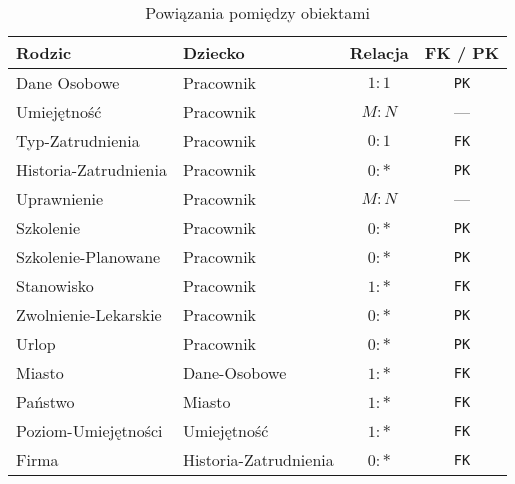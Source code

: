 \documentclass[a4paper]{article}
\begin{document}
\begin{table}[!htbp]
  \centering
  \begin{tabu}{|l|l|c|c|}
  \hline
	\large\textbf{Rodzic}&\large\textbf{Dziecko} &\large\textbf{Relacja}&\large\textbf{FK / PK}\\
	
	\hline
	Dane Osobowe & Pracownik  & $1:1$ & \texttt{PK} \\	
	\hline		
	Umiejętność & Pracownik  & $M:N$ &  --- \\
	\hline	
	Typ-Zatrudnienia & Pracownik & $0:1$ & \texttt{FK}\\
	\hline
	Historia-Zatrudnienia & Pracownik & $0:*$  & \texttt{PK}\\
	\hline
	Uprawnienie & Pracownik & $M:N$ & ---\\
	\hline
	Szkolenie & Pracownik & $0:*$ & \texttt{PK}\\
	\hline
	Szkolenie-Planowane & Pracownik & $0:*$ & \texttt{PK}\\
	\hline
	Stanowisko & Pracownik& $1:*$ &	\texttt{FK}\\
	\hline
	Zwolnienie-Lekarskie & Pracownik & $0:*$ & \texttt{PK}\\
	\hline
	Urlop & Pracownik & $0:*$ & \texttt{PK}\\	
	
	\hline	
	Miasto &  Dane-Osobowe &$1:*$ &\texttt{FK}\\
	
	\hline
	Państwo & Miasto & $1:*$ & \texttt{FK}	\\
	
	\hline
	Poziom-Umiejętności & Umiejętność & $1:*$ & \texttt{FK}\\	

	\hline	
	Firma & Historia-Zatrudnienia & $0:*$& \texttt{FK}\\	
	
	\hline
  \end{tabu}
  \caption{Powiązania pomiędzy obiektami}
  \label{tab:myfirsttable}
\end{table}
\end{document}
